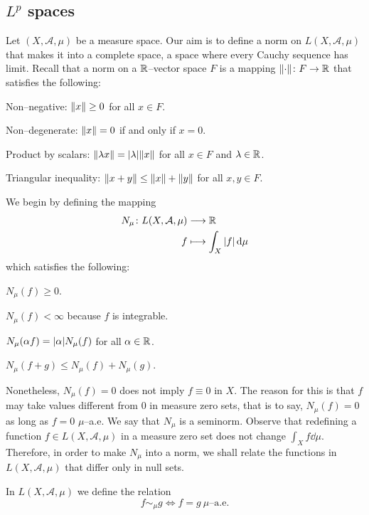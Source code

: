 \subsection{\texorpdfstring{$L^p$}{L--p} spaces}

Let $(X, \mathcal{A}, \mu)$ be a measure space. Our aim is to define a norm on
$L(X, \mathcal{A}, \mu)$ that makes it into a complete space, \ie a space where
every Cauchy sequence has limit. Recall that a norm on a $\mathbb{R}$--vector space
$F$ is a mapping $\norm{\cdot} \colon F \rightarrow \mathbb{R}$ that satisfies the
following:
\begin{enumeratedef}
	\item Non--negative: $\norm{x} \geq 0$ for all $x \in F$.
	\item Non--degenerate: $\norm{x} = 0$ if and only if $x = 0$.
	\item Product by scalars: $\norm{\lambda x} = \abs{\lambda} \norm{x}$ for all $x \in F$ and $\lambda \in \mathbb{R}$.
	\item Triangular inequality: $\norm{x + y} \leq \norm{x} + \norm{y}$ for all $x, y \in F$.
\end{enumeratedef}

We begin by defining the mapping
\[
	\begin{aligned}
		N_\mu \colon L(X, \mathcal{A}, \mu) &\longrightarrow \mathbb{R} \\
		f &\longmapsto \int_X \abs{f} \dd{\mu}
	\end{aligned}
\]
which satisfies the following:
\begin{enumerateprop}
	\item $N_\mu(f) \geq 0$.
	\item $N_\mu(f) < \infty$ because $f$ is integrable.
	\item $N_\mu(\alpha f) = \abs{\alpha} N_\mu(f)$ for all $\alpha \in \mathbb{R}$.
	\item $N_\mu(f + g) \leq N_\mu(f) + N_\mu(g)$.
\end{enumerateprop}
Nonetheless, $N_\mu(f) = 0$ does not imply $f \equiv 0$ in $X$. The reason for
this is that $f$ may take values different from $0$ in measure zero sets, that is to
say, $N_\mu(f) = 0$ as long as $f = 0$ $\mu$--a.e. We say that $N_\mu$ is a
seminorm. Observe that redefining a function $f \in L(X, \mathcal{A}, \mu)$ in a
measure zero set does not change $\int_X f \dd{\mu}$. Therefore, in order to make
$N_\mu$ into a norm, we shall relate the functions in $L(X, \mathcal{A}, \mu)$
that differ only in null sets.

\begin{definition*}
	In $L(X, \mathcal{A}, \mu)$ we define the relation
	\begin{equation} \label{eq:equivalence_relation}
		f \sim_\mu g \iff f = g \ \mu\text{--a.e.}	
	\end{equation}
\end{definition*}

